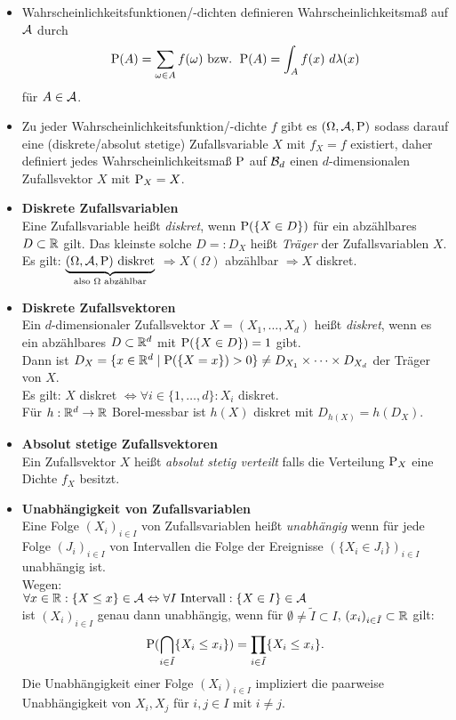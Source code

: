 \begin{itemize}
\item
Wahrscheinlichkeitsfunktionen/-dichten definieren Wahrscheinlichkeitsmaß auf $\A$
durch 
\[
\P(A)=\sum_{\omega\in A}f(\omega) \text{ bzw. } \P(A)=\int_A f(x)~d\lambda(x)
\]
für $A\in\A$.

\item
Zu jeder Wahrscheinlichkeitsfunktion/-dichte $f$ gibt es $(\Omega,\A,\P)$ sodass
darauf eine (diskrete/absolut stetige) Zufallsvariable $X$ mit $f_X=f$ existiert,
daher definiert jedes Wahrscheinlichkeitsmaß $\P$ auf $\B{d}$ einen
$d$-dimensionalen Zufallsvektor $X$ mit $\P_X=X$.

\item \textbf{Diskrete Zufallsvariablen}\\
Eine Zufallsvariable heißt \textit{diskret}, wenn $\P(\{X\in D\})$ für ein abzählbares
$D\subset\R$ gilt. Das kleinste solche $D=:D_X$ heißt \textit{Träger} der
Zufallsvariablen $X$.\\
Es gilt: 
$\underbrace{(\Omega,\A,\P) \text{ diskret}}_{\text{also $\Omega$ abzählbar}}$
$\Rightarrow X(\Omega)$ abzählbar $\Rightarrow X$ diskret.

\item \textbf{Diskrete Zufallsvektoren}\\
Ein $d$-dimensionaler Zufallsvektor $X=(X_1,\ldots,X_d)$ heißt \textit{diskret},
wenn es ein abzählbares $D\subset\R^d$ mit $\P(\{X\in D\})=1$ gibt.\\
Dann ist $D_X=\{x\in\R^d\mid \P(\{X=x\})>0\}\neq D_{X_1}\times\cdots\times D_{X_d}$
der Träger von $X$.\\
Es gilt: $X$ diskret $\Leftrightarrow\forall i\in\{1,\ldots,d\}: X_i$ diskret.\\
Für $h:\R^d\to\R$ Borel-messbar ist $h(X)$ diskret mit $D_{h(X)}=h(D_X)$.

\item \textbf{Absolut stetige Zufallsvektoren}\\
Ein Zufallsvektor $X$ heißt \textit{absolut stetig verteilt} falls die Verteilung
$\P_X$ eine Dichte $f_X$ besitzt.

\item
\textbf{Unabhängigkeit von Zufallsvariablen}\\
Eine Folge $(X_i)_{i\in I}$ von Zufallsvariablen heißt \textit{unabhängig} wenn für
jede Folge $(J_i)_{i\in I}$ von Intervallen die Folge der Ereignisse
$(\{X_i\in J_i\})_{i\in I}$ unabhängig ist.\\
Wegen:\\
$\forall x\in\R:\{X\leq x\}\in\A
\Leftrightarrow\forall I \text{ Intervall}:\{X\in I\}\in\A$\\ \newline
ist $(X_i)_{i\in I}$ genau dann unabhängig, wenn für 
$\emptyset\neq\tilde{I}\subset I$, $(x_i)_{i\in\tilde{I}}\subset\R$ gilt:
\[
	\P(\bigcap_{i\in\tilde{I}}\{X_i\leq x_i\})=\prod_{i\in\tilde{I}}\{X_i\leq x_i\}.
\]
Die Unabhängigkeit einer Folge $(X_i)_{i\in I}$ impliziert die paarweise
Unabhängigkeit von $X_i,X_j$ für $i,j\in I$ mit $i\neq j$.


\end{itemize}
